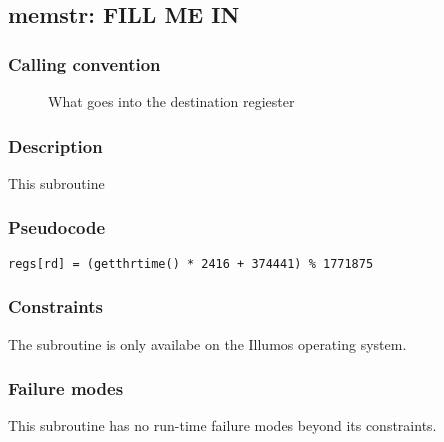 \clearpage
{}
{}
\label{subr:memstr}
\subsection*{memstr: FILL ME IN}

\subsubsection*{Calling convention}

\begin{description}
\item[] What goes into the destination regiester
\end{description}

\subsubsection*{Description}

This subroutine 
\subsubsection*{Pseudocode}

\begin{verbatim}
regs[rd] = (getthrtime() * 2416 + 374441) % 1771875
\end{verbatim}

\subsubsection*{Constraints}

The  subroutine is only availabe on the Illumos
operating system.

\subsubsection*{Failure modes}

This subroutine has no run-time failure modes beyond its constraints.
